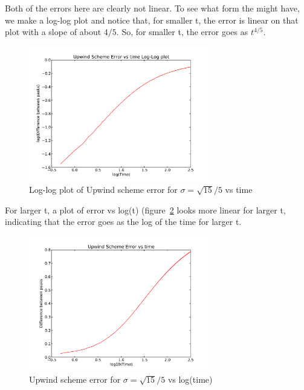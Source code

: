 \documentclass[11pt,letterpaper]{article}
\begin{document}
Both of the errors here are clearly not linear. To see what form the might have,
we make a log-log plot and notice that, for smaller t, the error is linear on that
plot with a slope of about $4/5$. So, for smaller t, the error goes as $t^{4/5}$. 

\begin{figure}[bth]
\centering
\includegraphics[width=0.7\textwidth]{error2log.pdf}
\caption{Log-log plot of Upwind scheme error for $\sigma = \sqrt{15}/5$ vs time}
\label{fig:error2log}
\end{figure}

For larger t, a plot of error vs log(t) (figure~\ref{fig:error2logt} looks more linear for larger t, indicating
that the error goes as the log of the time for larger t.

\begin{figure}[bth]
\centering
\includegraphics[width=0.7\textwidth]{error2logt.pdf}
\caption{Upwind scheme error for $\sigma = \sqrt{15}/5$ vs log(time)}
\label{fig:error2logt}
\end{figure}

\section{}
\end{document}
